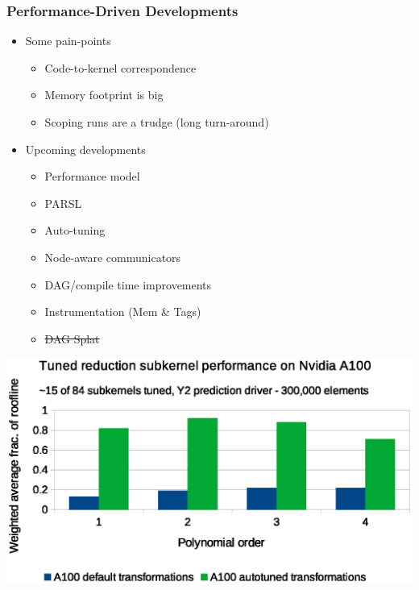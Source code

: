 \begin{frame}\frametitle{Performance-Driven Developments}
\begin{multicols}{2}
\begin{itemize}
\item Some pain-points
\begin{itemize}
\item Code-to-kernel correspondence
\item Memory footprint is big
\item Scoping runs are a trudge (long turn-around)
\end{itemize}
\item Upcoming developments
\begin{itemize}
\item Performance model
\item PARSL 
\item Auto-tuning 
\item Node-aware communicators 
\item DAG/compile time improvements 
\item Instrumentation (Mem \& Tags) 
\item \sout{DAG Splat} 
\end{itemize}
\end{itemize}
\columnbreak
\end{multicols}
\vspace{-20pt}
\begin{center}
\includegraphics[width=.5\textwidth]{figures/Nvidia-A100-performance.eps}
\end{center}
\end{frame}

